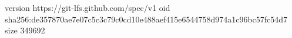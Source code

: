 version https://git-lfs.github.com/spec/v1
oid sha256:de357870ae7e07c5c3c79c0cd10e488aef415e6544758d974a1c96bc57fc54d7
size 349692
